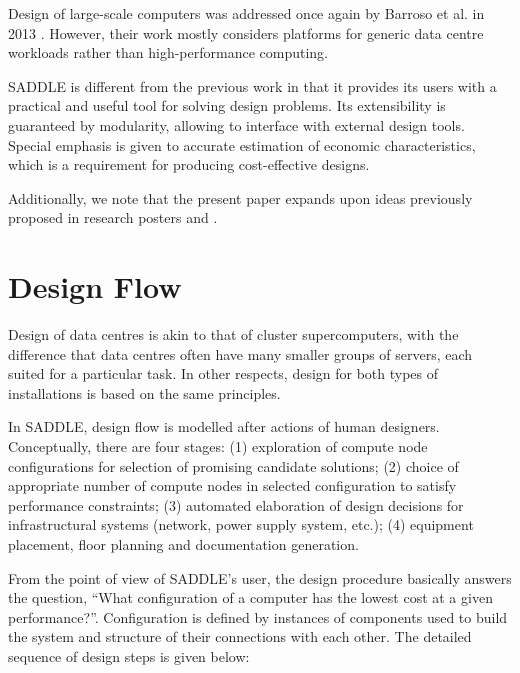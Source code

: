 \documentclass[runningheads,a4paper]{llncs}
\begin{document}
Design of large-scale computers was addressed once again by Barroso et al. in 2013 \cite{barroso2013datacenter}. However, their work mostly considers platforms for generic data centre workloads rather than high-performance computing.

SADDLE is different from the previous work in that it provides its users with a practical and useful tool for solving design problems. Its extensibility is guaranteed by modularity, allowing to interface with external design tools. Special emphasis is given to accurate estimation of economic characteristics, which is a requirement for producing cost-effective designs.

Additionally, we note that the present paper expands upon ideas previously proposed in research posters \cite{solnushkin2011combinatorial} and \cite{solnushkin2012computer}.


\section{Design Flow}
\label{Design-Flow}

Design of data centres is akin to that of cluster supercomputers, with the difference that data centres often have many smaller groups of servers, each suited for a particular task. In other respects, design for both types of installations is based on the same principles.

In SADDLE, design flow is modelled after actions of human designers. Conceptually, there are four stages: (1) exploration of compute node configurations for selection of promising candidate solutions; (2) choice of appropriate number of compute nodes in selected configuration to satisfy performance constraints; (3) automated elaboration of design decisions for infrastructural systems (network, power supply system, etc.); (4) equipment placement, floor planning and documentation generation.

From the point of view of SADDLE's user, the design procedure basically answers the question, ``What configuration of a computer has the lowest cost at a given performance?''. Configuration is defined by instances of components used to build the system and structure of their connections with each other. The detailed sequence of design steps is given below:
\end{document}
